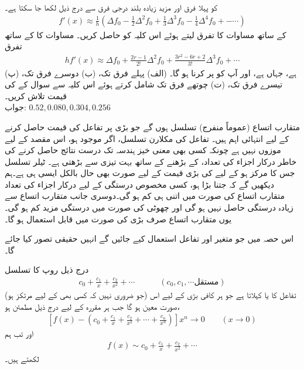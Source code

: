  کو پہلا فرق اور مزید زیادہ بلند درجی فرق سے درج ذیل لکھا جا سکتا ہے۔ 
\begin{align*}
f'(x)\approx \frac{1}{h}(\Delta f_0-\frac{1}{2}\Delta^2 f_0+\frac{1}{3}\Delta^3f_0-\frac{1}{4}\Delta^4 f_0+-\cdots)
\end{align*}
 کے ساتھ مساوات  کا  تفرق لیتے ہوئے اس کلیہ کو حاصل کریں۔ مساوات  کا  کے ساتھ تفرق
\begin{align*}
hf'(x)\approx \Delta f_0+\frac{2r-1}{2!}\Delta^2 f_0+\frac{3r^2-6r+2}{3!}\Delta^3f_0+\cdots
\end{align*}
ہے،  جہاں  ہے، اور آپ کو  پر کرنا ہو گا۔ (الف) پہلے فرق تک، (ب) دوسرے فرق تک، (پ) تیسرے فرق تک، (ت) چوتھے فرق تک  شامل کرتے ہوئے  اس کلیہ سے  سوال  کے  کی قیمت تلاش کریں۔ \\
جواب:\quad
$0.52, 0.080, 0.304, 0.256$

متقارب اتساع (عموماً منفرج) تسلسل ہوں گے جو بڑی  پر تفاعل  کی قیمت حاصل کرنے کے  لیے  انتہائی اہم ہیں۔ تفاعل  کی مکلارن تسلسل، اگر موجود ہو،  اس مقصد کے لیے موزوں نہیں ہے چونکہ  کسی بھی معنی خیز ہندسہ تک درست نتائج حاصل کرنے کی خاطر درکار اجزاء کی تعداد،  کے بڑھنے کے ساتھ بہت تیزی سے بڑھتی ہے۔ ٹیلر تسلسل جس کا مرکز  ہو کے لیے  کی بڑی قیمت کے لیے صورت بھی حال بالکل ایسی ہی ہے۔ہم دیکھیں گے کہ  جتنا بڑا ہو، کسی مخصوص درستگی کے لیے درکار اجزاء کی تعداد متقارب اتساع کی صورت میں اتنی ہی کم ہو گی۔دوسری جانب متقارب اتساع سے زیادہ درستگی حاصل نہیں ہو گی اور چھوٹی  کی صورت میں درستگی مزید کم ہو گی۔یوں متقارب اتساع صرف بڑی  کی صورت میں قابل استعمال ہو گا۔

اس حصہ میں جو متغیر اور تفاعل استعمال کیے جائیں گے انہیں حقیقی تصور کیا جائے گا۔

درج ذیل روپ کا تسلسل 
\begin{align*}
c_0+\frac{c_1}{x}+\frac{c_2}{x^2}+\cdots\quad\quad\quad (c_0,c_1,\cdots \text{مستقل})
\end{align*}
(جو ضروری نہیں کہ کسی بھی  کے لیے مرتکز ہو) تفاعل  کا   یا  کہلاتا ہے جو ہر کافی بڑی  کے لیے اس صورت معین ہو گا جب ہر مقررہ  کے لیے درج ذیل مطمئن ہو،
\begin{align}\label{مساوات_اعدادی_متقارب_الف}
[f(x)-(c_0+\frac{c_1}{x}+\frac{c_2}{x^2}+\cdots+\frac{c_n}{x^n})]x^n\to 0  \quad \quad (x\to 0) 
\end{align}
اور تب ہم
\begin{align*}
f(x) \sim c_0+\frac{c_1}{x}+\frac{c_2}{x^2}+\cdots
\end{align*}
لکھتے ہیں۔

